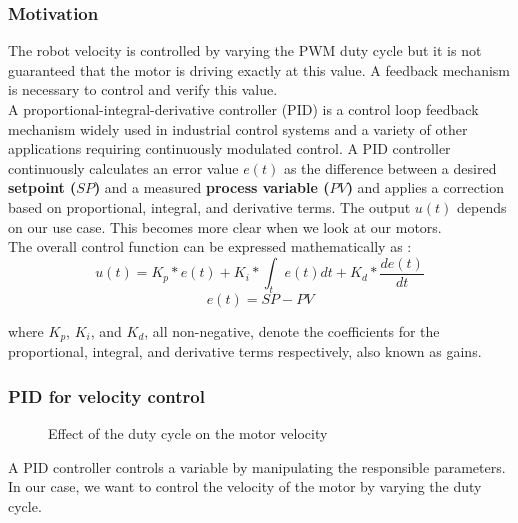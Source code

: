 \subsubsection*{Motivation}

The robot velocity is controlled by varying the PWM duty cycle but it is not guaranteed that the motor is driving exactly at this value. A feedback mechanism is necessary to control and verify this value.\\
\vskip 0.1in
\noindent
A proportional-integral-derivative controller (PID) is a control loop feedback mechanism widely used in industrial control systems and a variety of other applications requiring continuously modulated control. A PID controller continuously calculates an error value $e(t)$ as the difference between a desired \textbf{setpoint ($SP$)} and a measured \textbf{process variable ($PV$)} and applies a correction based on proportional, integral, and derivative terms. The output $u(t)$ depends on our use case. This becomes more clear when we look at our motors.\\
The overall control function can be expressed mathematically as : 
$$u(t)= K_{p}*e(t) + K_{i}*\int_t e(t) dt + K_{d}*\frac{d e(t)}{dt} $$
$$e(t) = SP - PV$$
 
where $K_p$, $K_i$, and $K_d$, all non-negative, denote the coefficients for the proportional, integral, and derivative terms respectively, also known as gains.

\subsubsection*{PID for velocity control}

\begin{figure}
    \centering
{}
    \caption{Effect of the duty cycle on the motor velocity} \label{fig:DC_V}
\end{figure}


A PID controller controls a variable by manipulating the responsible parameters. In our case, we want to control the velocity of the motor by varying the duty cycle. 

